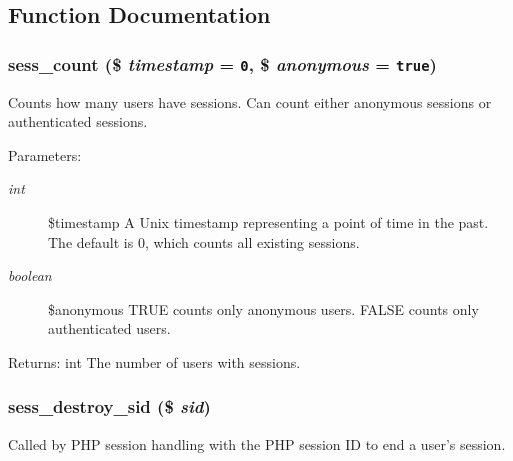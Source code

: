 \subsection{Function Documentation}
\hypertarget{session_8inc_ad174594c4667d63374cc5e119b41c16}{
\subsubsection[{sess\_\-count}]{\setlength{\rightskip}{0pt plus 5cm}sess\_\-count (\$ {\em timestamp} = {\tt 0}, \/  \$ {\em anonymous} = {\tt true})}}
\label{session_8inc_ad174594c4667d63374cc5e119b41c16}


Counts how many users have sessions. Can count either anonymous sessions or authenticated sessions.

\begin{Desc}
\item[Parameters:]
\begin{description}
\item[{\em int}]\$timestamp A Unix timestamp representing a point of time in the past. The default is 0, which counts all existing sessions. \item[{\em boolean}]\$anonymous TRUE counts only anonymous users. FALSE counts only authenticated users. \end{description}
\end{Desc}
\begin{Desc}
\item[Returns:]int The number of users with sessions. \end{Desc}
\hypertarget{session_8inc_7afedd239d078990780ecc2745e64afb}{
\subsubsection[{sess\_\-destroy\_\-sid}]{\setlength{\rightskip}{0pt plus 5cm}sess\_\-destroy\_\-sid (\$ {\em sid})}}
\label{session_8inc_7afedd239d078990780ecc2745e64afb}


Called by PHP session handling with the PHP session ID to end a user's session.

